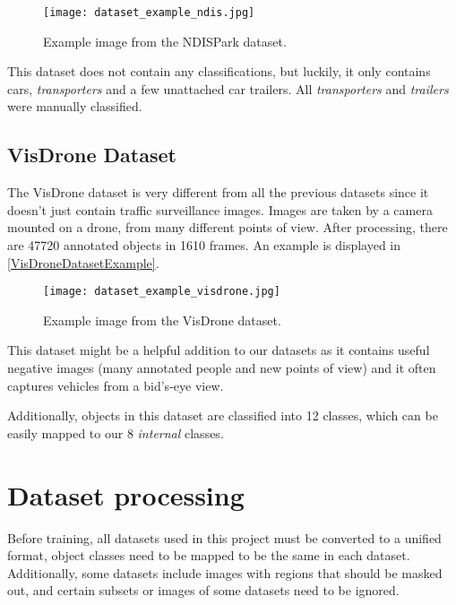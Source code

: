 \begin{figure}[h]
    \centering
    \texttt{[image: dataset\_example\_ndis.jpg]}
    \caption{Example image from the NDISPark dataset.}
    \label{NDISDatasetExample}
\end{figure}

This dataset does not contain any classifications, but luckily, it only contains
cars, \textit{transporters} and a few unattached car trailers. All
\textit{transporters} and \textit{trailers} were manually classified.


\subsection{VisDrone Dataset}

The VisDrone dataset \cite{Zhu2022} is very different from all the previous
datasets since it doesn't just contain traffic surveillance images. Images are
taken by a camera mounted on a drone, from many different points of view. After
processing, there are \num{47720} annotated objects in \num{1610} frames. An
example is displayed in \autoref{VisDroneDatasetExample}.

\begin{figure}[h]
    \centering
    \texttt{[image: dataset\_example\_visdrone.jpg]}
    \caption{Example image from the VisDrone dataset.}
    \label{VisDroneDatasetExample}
\end{figure}

This dataset might be a helpful addition to our datasets as it contains useful
negative images (many annotated people and new points of view) and it often
captures vehicles from a bid's-eye view.

Additionally, objects in this dataset are classified into 12 classes, which can
be easily mapped to our 8 \textit{internal} classes.


\section{Dataset processing}

Before training, all datasets used in this project must be converted to a
unified format, object classes need to be mapped to be the same in each dataset.
Additionally, some datasets include images with regions that should be masked
out, and certain subsets or images of some datasets need to be ignored.

